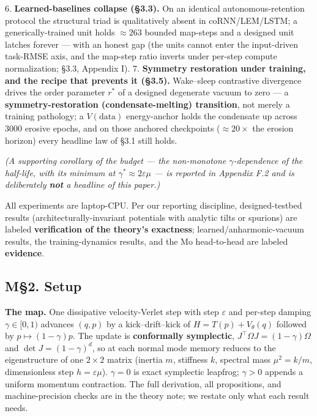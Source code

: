 \documentclass[10pt]{article}
\begin{document}
6. \textbf{Learned-baselines collapse (\S3.3).} On an identical autonomous-retention protocol the structural triad is qualitatively absent in coRNN/LEM/LSTM; a generically-trained unit holds $\approx263$ bounded map-steps and a designed unit latches forever --- with an honest gap (the units cannot enter the input-driven task-RMSE axis, and the map-step ratio inverts under per-step compute normalization; \S3.3, Appendix I).
7. \textbf{Symmetry restoration under training, and the recipe that prevents it (\S3.5).} Wake--sleep contrastive divergence drives the order parameter $r^*$ of a designed degenerate vacuum to zero --- a \textbf{symmetry-restoration (condensate-melting) transition}, not merely a training pathology; a $V(\text{data})$ energy-anchor holds the condensate up across $3000$ erosive epochs, and on those anchored checkpoints ($\approx20\times$ the erosion horizon) every headline law of \S3.1 still holds.

\emph{(A supporting corollary of the budget --- the non-monotone $\gamma$-dependence of the half-life, with its minimum at $\gamma^*\approx2\varepsilon\mu$ --- is reported in Appendix F.2 and is deliberately \textbf{not} a headline of this paper.)}

All experiments are laptop-CPU. Per our reporting discipline, designed-testbed results (architecturally-invariant potentials with analytic tilts or spurions) are labeled \textbf{verification of the theory's exactness}; learned/anharmonic-vacuum results, the training-dynamics results, and the Mo head-to-head are labeled \textbf{evidence}.


\subsection*{M\S2. Setup}

\textbf{The map.} One dissipative velocity-Verlet step with step $\varepsilon$ and per-step damping $\gamma\in[0,1)$ advances $(q,p)$ by a kick--drift--kick of $H=T(p)+V_\theta(q)$ followed by $p\mapsto(1-\gamma)p$. The update is \textbf{conformally symplectic}, $J^\top\Omega J=(1-\gamma)\Omega$ and $\det J=(1-\gamma)^d$, so at each normal mode memory reduces to the eigenstructure of one $2\times2$ matrix (inertia $m$, stiffness $k$, spectral mass $\mu^2=k/m$, dimensionless step $h=\varepsilon\mu$). $\gamma=0$ is exact symplectic leapfrog; $\gamma>0$ appends a uniform momentum contraction. The full derivation, all propositions, and machine-precision checks are in the theory note; we restate only what each result needs.
\end{document}

